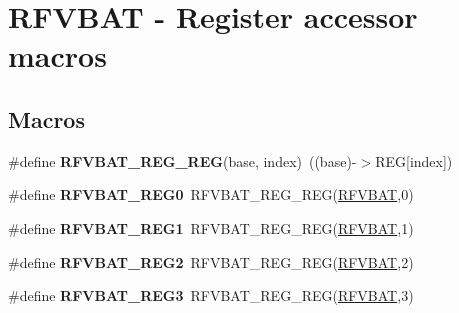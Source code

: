 \hypertarget{group__RFVBAT__Register__Accessor__Macros}{}\section{R\+F\+V\+B\+AT -\/ Register accessor macros}
\label{group__RFVBAT__Register__Accessor__Macros}
\subsection*{Macros}
\begin{DoxyCompactItemize}
\item 
\#define {\bfseries R\+F\+V\+B\+A\+T\+\_\+\+R\+E\+G\+\_\+\+R\+EG}(base,  index)~((base)-\/$>$R\+EG\mbox{[}index\mbox{]})\hypertarget{group__RFVBAT__Register__Accessor__Macros_gacf2bd7e40406e90d975e9ff55ead11d6}{}\label{group__RFVBAT__Register__Accessor__Macros_gacf2bd7e40406e90d975e9ff55ead11d6}

\item 
\#define {\bfseries R\+F\+V\+B\+A\+T\+\_\+\+R\+E\+G0}~R\+F\+V\+B\+A\+T\+\_\+\+R\+E\+G\+\_\+\+R\+EG(\hyperlink{group__RFVBAT__Peripheral__Access__Layer_gac2c2895b56604565c1deab90aedbf1a4}{R\+F\+V\+B\+AT},0)\hypertarget{group__RFVBAT__Register__Accessor__Macros_gab2c2deaa663210dcbe5b3c7c9dd3c279}{}\label{group__RFVBAT__Register__Accessor__Macros_gab2c2deaa663210dcbe5b3c7c9dd3c279}

\item 
\#define {\bfseries R\+F\+V\+B\+A\+T\+\_\+\+R\+E\+G1}~R\+F\+V\+B\+A\+T\+\_\+\+R\+E\+G\+\_\+\+R\+EG(\hyperlink{group__RFVBAT__Peripheral__Access__Layer_gac2c2895b56604565c1deab90aedbf1a4}{R\+F\+V\+B\+AT},1)\hypertarget{group__RFVBAT__Register__Accessor__Macros_gaad1d344fc43c23927596453cbbfbe87f}{}\label{group__RFVBAT__Register__Accessor__Macros_gaad1d344fc43c23927596453cbbfbe87f}

\item 
\#define {\bfseries R\+F\+V\+B\+A\+T\+\_\+\+R\+E\+G2}~R\+F\+V\+B\+A\+T\+\_\+\+R\+E\+G\+\_\+\+R\+EG(\hyperlink{group__RFVBAT__Peripheral__Access__Layer_gac2c2895b56604565c1deab90aedbf1a4}{R\+F\+V\+B\+AT},2)\hypertarget{group__RFVBAT__Register__Accessor__Macros_ga2cb98ee1f823c18c81f270beb24b359a}{}\label{group__RFVBAT__Register__Accessor__Macros_ga2cb98ee1f823c18c81f270beb24b359a}

\item 
\#define {\bfseries R\+F\+V\+B\+A\+T\+\_\+\+R\+E\+G3}~R\+F\+V\+B\+A\+T\+\_\+\+R\+E\+G\+\_\+\+R\+EG(\hyperlink{group__RFVBAT__Peripheral__Access__Layer_gac2c2895b56604565c1deab90aedbf1a4}{R\+F\+V\+B\+AT},3)\hypertarget{group__RFVBAT__Register__Accessor__Macros_ga7d8455bad7fb104b0a327253883e0df9}{}\label{group__RFVBAT__Register__Accessor__Macros_ga7d8455bad7fb104b0a327253883e0df9}


\end{DoxyCompactItemize}
